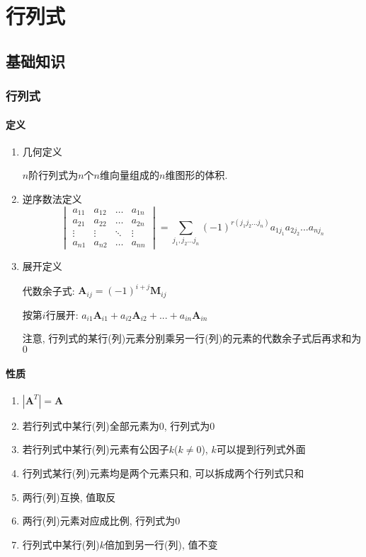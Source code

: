 \chapter{行列式}
\section{基础知识}
\subsection{行列式}
\subsubsection{定义}
\begin{enumerate}
	\item 几何定义\par $ n $阶行列式为$ n $个$ n $维向量组成的$ n $维图形的体积.
	\item 逆序数法定义
	\begin{equation*}
		\begin{vmatrix}
			a_{11}	&a_{12}  &\dots  &a_{1n}  \\
			a_{21}	&a_{22}  &\dots  &a_{2n}  \\
			\vdots	&\vdots  &\ddots  &\vdots  \\
			a_{n1}	&a_{n2}  &\dots  &a_{nn}  
		\end{vmatrix}  = \sum_{j_{1},j_{2}...j_{n}}(-1)^{r(j_{1}j_{2}...j_{n})}a_{1j_{1}}a_{2j_{2}}...a_{nj_{n}}
	\end{equation*}
    \item 展开定义\par 代数余子式: $ \bm{A}_{ij}=(-1)^{i+j}\bm{M}_{ij} $\par 按第$ i $行展开: $ a_{i1}\bm{A}_{i1}+a_{i2}\bm{A}_{i2}+...+a_{in}\bm{A}_{in} $\par 注意, 行列式的某行(列)元素分别乘另一行(列)的元素的代数余子式后再求和为$ 0 $
\end{enumerate}
\subsubsection{性质}
\begin{enumerate}
	\item $ |\bm{A}^{T}|=\bm{A} $
	\item 若行列式中某行(列)全部元素为$ 0 $, 行列式为$ 0 $
	\item 若行列式中某行(列)元素有公因子$ k $($ k\neq 0 $), $ k $可以提到行列式外面
	\item 行列式某行(列)元素均是两个元素只和, 可以拆成两个行列式只和
	\item 两行(列)互换, 值取反
	\item 两行(列)元素对应成比例, 行列式为$ 0 $
	\item 行列式中某行(列)$ k $倍加到另一行(列), 值不变
\end{enumerate}
